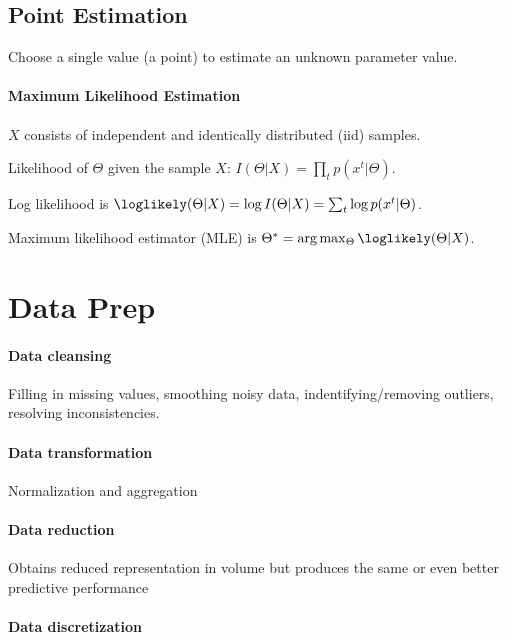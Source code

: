 \documentclass{idc_msc}
\begin{document}
\subsection{Point Estimation}

Choose a single value (a point) to estimate an unknown parameter value.

\paragraph{Maximum Likelihood Estimation}

$X$ consists of independent and identically distributed (iid) samples.

Likelihood of $\Theta$ given the sample $X$: $I(\Theta | X) = \prod_t p(x^t|\Theta)$.

Log likelihood is $\loglikely(\Theta|X) = \log I(\Theta | X) = \sum_t \log p(x^t|\Theta)$.

Maximum likelihood estimator (MLE) is $\Theta^*=\arg\max_{\Theta}\loglikely(\Theta|X)$.


\section{Data Prep}

\paragraph{Data cleansing}

Filling in missing values, smoothing noisy data, indentifying/removing outliers, resolving inconsistencies.

\paragraph{Data transformation}

Normalization and aggregation

\paragraph{Data reduction}

Obtains reduced representation in volume but produces the same or even better predictive performance

\paragraph{Data discretization}
\end{document}
